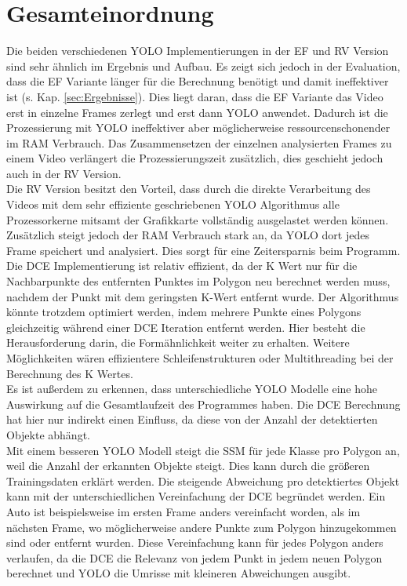 {	\section{Gesamteinordnung}
	{ 
	Die beiden verschiedenen YOLO Implementierungen in der EF und RV Version sind sehr ähnlich im Ergebnis und Aufbau. Es zeigt sich jedoch in der Evaluation, dass die EF Variante länger für die Berechnung benötigt und damit ineffektiver ist (s. Kap. \ref{sec:Ergebnisse}). Dies liegt daran, dass die EF Variante das Video erst in einzelne Frames zerlegt und erst dann YOLO anwendet. Dadurch ist die Prozessierung mit YOLO ineffektiver aber möglicherweise ressourcenschonender im RAM Verbrauch.  Das Zusammensetzen der einzelnen analysierten Frames zu einem Video verlängert die Prozessierungszeit zusätzlich, dies geschieht jedoch auch in der RV Version. \\
	Die RV Version besitzt den Vorteil, dass durch die direkte Verarbeitung des Videos mit dem sehr effiziente geschriebenen YOLO Algorithmus alle Prozessorkerne mitsamt der Grafikkarte vollständig ausgelastet werden können. Zusätzlich steigt jedoch der RAM Verbrauch stark an, da YOLO dort jedes Frame speichert und analysiert. Dies sorgt für eine Zeitersparnis beim Programm. \\ 
	Die DCE Implementierung ist relativ effizient, da der K Wert nur für die Nachbarpunkte des entfernten Punktes im Polygon neu berechnet werden muss, nachdem der Punkt mit dem geringsten K-Wert entfernt wurde. Der Algorithmus könnte trotzdem optimiert werden, indem mehrere Punkte eines Polygons gleichzeitig während einer DCE Iteration entfernt werden. Hier besteht die Herausforderung darin, die Formähnlichkeit weiter zu erhalten. Weitere Möglichkeiten wären effizientere Schleifenstrukturen oder Multithreading bei der Berechnung des K Wertes. \\
	Es ist außerdem zu erkennen, dass unterschiedliche YOLO Modelle eine hohe Auswirkung auf die Gesamtlaufzeit des Programmes haben. Die DCE Berechnung hat hier nur indirekt einen Einfluss, da diese von der Anzahl der detektierten Objekte abhängt. \\
	
	Mit einem besseren YOLO Modell steigt die SSM für jede Klasse pro Polygon an, weil die Anzahl der erkannten Objekte steigt. Dies kann durch die größeren Trainingsdaten erklärt werden. Die steigende Abweichung pro detektiertes Objekt kann mit der unterschiedlichen Vereinfachung der DCE begründet werden. Ein Auto ist beispielsweise im ersten Frame anders vereinfacht worden, als im nächsten Frame, wo möglicherweise andere Punkte zum Polygon hinzugekommen sind oder entfernt wurden. Diese Vereinfachung kann für jedes Polygon anders verlaufen, da die DCE die Relevanz von jedem Punkt in jedem neuen Polygon berechnet und YOLO die Umrisse mit kleineren Abweichungen ausgibt.

}}

